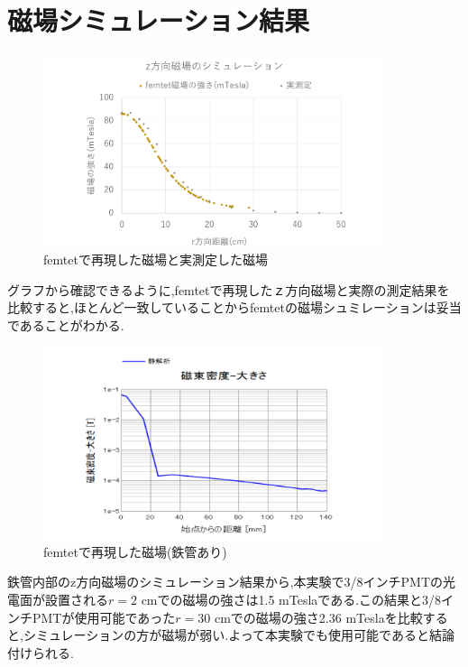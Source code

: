 \section{磁場シミュレーション結果}
\begin{figure}[H]
	\centering
		\includegraphics[width=10cm]{fig/iguchi/femtetgraph.pdf}
	\caption{femtetで再現した磁場と実測定した磁場}
	\label{femtegraph}
\end{figure}

グラフから確認できるように,femtetで再現したｚ方向磁場と実際の測定結果を比較すると,ほとんど一致していることからfemtetの磁場シュミレーションは妥当であることがわかる.
\begin{figure}[H]
	\centering
		\includegraphics[width=10cm]{fig/iguchi/maggraphinFe.pdf}
	\caption{femtetで再現した磁場(鉄管あり)}
	\label{maggraphinFe}
\end{figure}
鉄管内部のz方向磁場のシミュレーション結果から,本実験で3/8インチPMTの光電面が設置される$r=2$ cmでの磁場の強さは1.5 mTeslaである.この結果と3/8インチPMTが使用可能であった$r=30$ cmでの磁場の強さ2.36 mTeslaを比較すると,シミュレーションの方が磁場が弱い.よって本実験でも使用可能であると結論付けられる.




